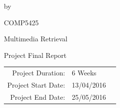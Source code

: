 \documentclass[whitelogo,12pt]{tudelft-report}
\begin{document}
%
%
\begin{titlepage}
\begin{center}


{\makeatletter
\largetitlestyle\fontsize{64}{94}\selectfont\@title
\makeatother}

{\makeatletter
\ifx\@subtitle\undefined\else
    \bigskip
   {\tudsffamily\fontsize{22}{32}\selectfont\@subtitle}    
\fi
\makeatother}

\bigskip
\bigskip
\bigskip
\bigskip
\bigskip
\bigskip

by

\bigskip
\bigskip
\bigskip


{\makeatletter
\largetitlestyle\fontsize{26}{26}\selectfont\@author
\makeatother}

\bigskip
\bigskip
\bigskip
\bigskip
\bigskip
\bigskip


\Large COMP5425

Multimedia Retrieval

Project Final Report

\bigskip
\bigskip
\bigskip
\bigskip
\bigskip
\bigskip
\bigskip
\bigskip

\begin{tabular}{rll}
    Project Duration: & 6 Weeks\\
    Project Start Date: 			& 13/04/2016\\
    Project End Date:   			& 25/05/2016
\end{tabular}

\bigskip
\bigskip

\bigskip
\bigskip



\end{center}


\end{titlepage}
\end{document}
